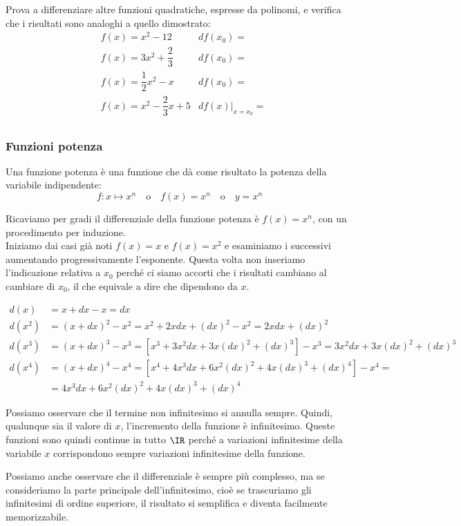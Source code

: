 Prova a differenziare altre funzioni quadratiche, espresse da polinomi,
e verifica che i risultati sono analoghi a quello dimostrato: 
\begin{align*}
&f(x) = x^2 - 12  &df(x_0)=\\
&f(x) = 3x^2 +\dfrac{2}{3}  &df(x_0)=\\
&f(x) = \dfrac{1}{2}x^2 - x  &df(x_0)=\\
&f(x) = x^2 - \dfrac{2}{3}x +5 &df(x)|_{x=x_0}=\\
\end{align*}


\subsubsection{Funzioni potenza}
\label{subsubsec:diff01_diffpot}

Una funzione potenza è una funzione che dà come risultato la potenza 
della variabile indipendente:
\[f: x \mapsto x^n \quad \text{o} \quad 
  f(x)=x^n \quad \text{o} \quad 
  y = x^n\]

Ricaviamo per gradi il differenziale della funzione potenza è $f(x)=x^n$, 
con un procedimento per induzione.\\
Iniziamo dai casi già noti $f(x)=x$ e $f(x)=x^2$ e esaminiamo i successivi
aumentando progressivamente l'esponente. Questa volta non inseriamo 
l'indicazione relativa a $x_0$ perché ci siamo accorti che i risultati cambiano 
al cambiare di $x_0$, il che equivale a dire che dipendono da $x$.


\begin{align*}
  d(x) &=x+dx-x =dx\\
  d(x^2) &=(x+dx)^2-x^2 = x^2 +2xdx +(dx)^2 -x^2 = 2xdx +(dx)^2\\
  d(x^3) &=(x+dx)^3-x^3 =[x^3+3x^2dx+3x(dx)^2+(dx)^3]-x^3=
                      3x^2dx+3x(dx)^2+(dx)^3\\
  d(x^4) &=(x+dx)^4-x^4 = [x^4+4x^3dx+6x^2(dx)^2+4x(dx)^3+(dx)^4]-x^4=\\
                      &=4x^3dx+6x^2(dx)^2+4x(dx)^3+(dx)^4      
\end{align*}


Possiamo osservare che il termine non infinitesimo si annulla sempre. Quindi,
qualunque sia il valore di \(x\), l'incremento della funzione è infinitesimo. 
Queste funzioni sono quindi continue in tutto \(\IR\) perché a variazioni 
infinitesime della variabile \(x\) corrispondono sempre variazioni
infinitesime della funzione.

Possiamo anche osservare che il differenziale è sempre più complesso, ma 
se consideriamo la parte principale dell'infinitesimo, cioè se trascuriamo 
gli infinitesimi di ordine superiore, il risultato si semplifica e diventa 
facilmente memorizzabile.


